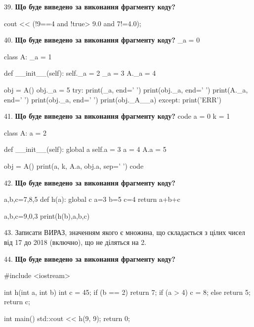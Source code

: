 \documentclass[11pt]{article}
\begin{document}
39. \textbf{Що буде виведено за виконання фрагменту коду?}

cout << (!9==4 and !true> 9.0 and 7!=4.0);
\par\vspace{5mm}

40. \textbf{Що буде виведено за виконання фрагменту коду?}
_a = 0

class A:
    _a = 1
    
    def __init__(self):
        self._a = 2
        _a = 3
        A._a = 4

obj = A()
obj._a = 5
try:
    print(_a, end=' ')
    print(obj._a, end=' ')
    print(A._a, end=' ')
    print(obj._a, end=' ')
    print(obj._A__a)
except:
    print('ERR')
\par\vspace{5mm}

41. \textbf{Що буде виведено за виконання фрагменту коду?}
code
a = 0
k = 1

class A:
    a = 2
    
    def __init__(self):
global a        self.a = 3
        a = 4
        A.a = 5

obj = A()
print(a, k, A.a, obj.a, sep=' ')
code
\par\vspace{5mm}

42. \textbf{Що буде виведено за виконання фрагменту коду?}

a,b,c=7,8,5
def h(a):
global c    a=3
    b=5
    c=4
    return a+b+c

a,b,c=9,0,3
print(h(b),a,b,c)
\par\vspace{5mm}

43. 
Записати ВИРАЗ, значенням якого є множина, що складається з цілих чисел від 17 до 2018 (включно), що не діляться на 2.\par\vspace{5mm}

44. \textbf{Що буде виведено за виконання фрагменту коду?}

#include <iostream>

int h(int a, int b){
    int c = 45;
    if (b == 2)
        return 7;
    if (a > 4)
         c = 8;
    else 
        return 5;
    return c;
}

int main(){
    std::cout << h(9, 9);
    return 0;
}
\par\vspace{5mm}
\end{document}
